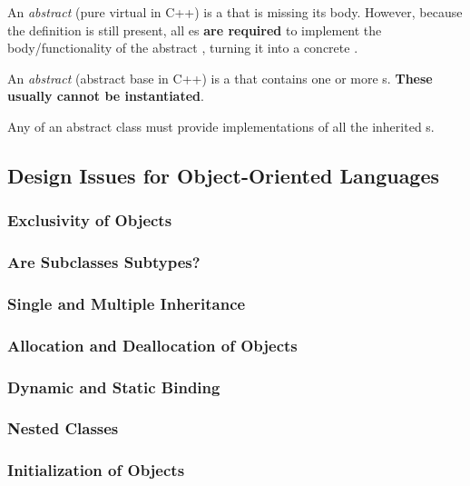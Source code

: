 \begin{definition}\label{def:OOP_Abstract_Method}
  An \emph{abstract } (pure virtual  in C++) is a  that is missing its body.
  However, because the  definition is still present, all es \textbf{are required} to implement the body/functionality of the abstract , turning it into a concrete .
\end{definition}

\begin{definition}\label{def:OOP_Abstract_Class}
  An \emph{abstract } (abstract base  in C++) is a  that contains one or more s.
  \textbf{These usually cannot be instantiated}.
  
  Any  of an abstract class must provide implementations of all the inherited s.
\end{definition}

\subsection{Design Issues for Object-Oriented Languages}\label{subsec:OOP_Design_Issues}
\subsubsection{Exclusivity of Objects}\label{subsubsec:OOP_Object_Exclusivity}
\subsubsection{Are Subclasses Subtypes?}\label{subsubsec:OOP_Subclasses_Subtypes}
\subsubsection{Single and Multiple Inheritance}\label{subsubsec:OOP_Single_Multiple_Inheritance}
\subsubsection{Allocation and Deallocation of Objects}\label{subsubsec:OOP_Object_Allocation_Deallocation}
\subsubsection{Dynamic and Static Binding}\label{subsubsec:OOP_Dynamic_Static_Binding}
\subsubsection{Nested Classes}\label{subsubsec:OOP_Nested_Classes}
\subsubsection{Initialization of Objects}\label{subsubsec:OOP_Object_Initialization}

